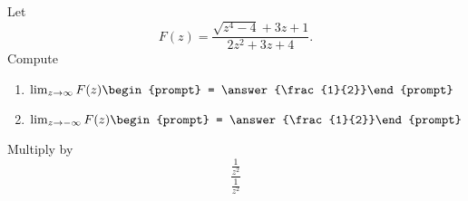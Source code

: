 \documentclass{ximera}
\author{Bart Snapp}
\begin{document}
\begin{exercise}
Let 
\[
F(z) = \frac{\sqrt{z^4-4}+3 z+1}{2 z^2+3 z+4}.
\]
Compute
\begin{enumerate}
\item $\lim_{z\to \infty} F(z) \begin{prompt} = \answer{\frac{1}{2}}\end{prompt}$
\item $\lim_{z\to -\infty}F(z) \begin{prompt} = \answer{\frac{1}{2}}\end{prompt}$
\end{enumerate}
\begin{hint}
Multiply by
\[
\frac{\frac{1}{z^2}}{\frac{1}{z^2}}
\]
\end{hint}
\end{exercise}
\end{document}

